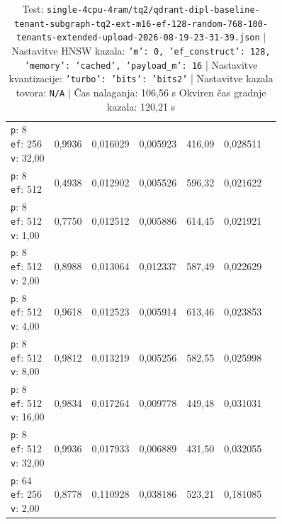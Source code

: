 \begin{table}[htbp]
\begin{tabularx}{\textwidth}{Xrrrrrr}
    \makecell{\texttt{p}: 8\\\texttt{ef}: 256\\\texttt{v}: 32,00} & 0,9936 & 0,016029 & 0,005923 & 416,09 & 0,028511 \\
    \makecell{\texttt{p}: 8\\\texttt{ef}: 512} & 0,4938 & 0,012902 & 0,005526 & 596,32 & 0,021622 \\
    \makecell{\texttt{p}: 8\\\texttt{ef}: 512\\\texttt{v}: 1,00} & 0,7750 & 0,012512 & 0,005886 & 614,45 & 0,021921 \\
    \makecell{\texttt{p}: 8\\\texttt{ef}: 512\\\texttt{v}: 2,00} & 0,8988 & 0,013064 & 0,012337 & 587,49 & 0,022629 \\
    \makecell{\texttt{p}: 8\\\texttt{ef}: 512\\\texttt{v}: 4,00} & 0,9618 & 0,012523 & 0,005914 & 613,46 & 0,023853 \\
    \makecell{\texttt{p}: 8\\\texttt{ef}: 512\\\texttt{v}: 8,00} & 0,9812 & 0,013219 & 0,005256 & 582,55 & 0,025998 \\
    \makecell{\texttt{p}: 8\\\texttt{ef}: 512\\\texttt{v}: 16,00} & 0,9834 & 0,017264 & 0,009778 & 449,48 & 0,031031 \\
    \makecell{\texttt{p}: 8\\\texttt{ef}: 512\\\texttt{v}: 32,00} & 0,9936 & 0,017933 & 0,006889 & 431,50 & 0,032055 \\
    \makecell{\texttt{p}: 64\\\texttt{ef}: 256\\\texttt{v}: 2,00} & 0,8778 & 0,110928 & 0,038186 & 523,21 & 0,181085 \\
    \bottomrule
  \end{tabularx}
\caption* {Test: \texttt{single-4cpu-4ram/tq2/qdrant-dipl-baseline-tenant-subgraph-tq2-ext-m16-ef-128-random-768-100-tenants-extended-upload-2026-08-19-23-31-39.json} | Nastavitve HNSW kazala: \texttt{{'m': 0, 'ef\_construct': 128, 'memory': 'cached', 'payload\_m': 16}} | Nastavitve kvantizacije: \texttt{{'turbo': {'bits': 'bits2'}}} | Nastavitve kazala tovora: \texttt{N/A} | Čas nalaganja: 106,56 s Okviren čas gradnje kazala: 120,21 s}\end{table}


